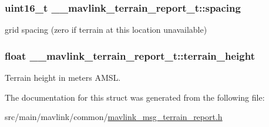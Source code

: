 \hypertarget{struct____mavlink__terrain__report__t_a66a81a4e33366a38e5d2c1c2c984587a}{
\subsubsection[{spacing}]{\setlength{\rightskip}{0pt plus 5cm}uint16\+\_\+t \+\_\+\+\_\+mavlink\+\_\+terrain\+\_\+report\+\_\+t\+::spacing}}\label{struct____mavlink__terrain__report__t_a66a81a4e33366a38e5d2c1c2c984587a}


grid spacing (zero if terrain at this location unavailable) 

\hypertarget{struct____mavlink__terrain__report__t_a3356e9c59dd79d7a9fdca0b545db9aa9}{
\subsubsection[{terrain\+\_\+height}]{\setlength{\rightskip}{0pt plus 5cm}float \+\_\+\+\_\+mavlink\+\_\+terrain\+\_\+report\+\_\+t\+::terrain\+\_\+height}}\label{struct____mavlink__terrain__report__t_a3356e9c59dd79d7a9fdca0b545db9aa9}


Terrain height in meters A\+M\+S\+L. 



The documentation for this struct was generated from the following file\+:\begin{DoxyCompactItemize}
\item 
src/main/mavlink/common/\hyperlink{mavlink__msg__terrain__report_8h}{mavlink\+\_\+msg\+\_\+terrain\+\_\+report.\+h}\end{DoxyCompactItemize}
